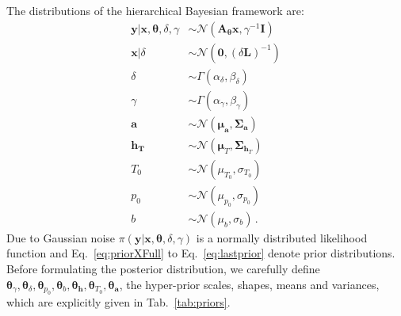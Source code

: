 \clearpage
\noindent
The distributions of the hierarchical Bayesian framework are:
\begin{subequations}
	\label{eq:BayMode}
	\begin{align}
		\bm{y} |  \bm{x},\bm{\theta},\delta,\gamma  &\sim \mathcal{N}(\bm{A}_{\bm{\theta}}  \bm{x}, \gamma^{-1} \bm{I}) \label{eq:likelihoodFull} \\
		\bm{x}| \delta  &\sim \mathcal{N}(\bm{0}, (\delta \bm{L})^{-1} ) \label{eq:priorXFull} \\
		\delta  &\sim \Gamma(\alpha_{\delta} , \beta_{\delta} )\label{eq:priorDelFull} \\
		\gamma  &\sim \Gamma(\alpha_{\gamma}, \beta_{\gamma})\label{eq:priorGamFull} \\
		\bm{a}  &\sim \mathcal{N}(\bm{\mu}_{\bm{a}}, \bm{\Sigma}_{\bm{a}})\\
		\bm{h}_{\bm{T}}  &\sim \mathcal{N}(\bm{\mu}_{T}, \bm{\Sigma}_{\bm{h}_T}) \\
		T_0  &\sim \mathcal{N}(\mu_{T_0}, \sigma_{T_0} )\\
		p_0  &\sim \mathcal{N}(\mu_{p_0}, \sigma_{p_0} )\\
		b  &\sim \mathcal{N}(\mu_b, \sigma_b )  \label{eq:lastprior}  \, .
	\end{align}
\end{subequations}
Due to Gaussian noise $\pi(\bm{y} |  \bm{x},\bm{\theta},\delta,\gamma )$ is a normally distributed likelihood function and Eq.~\ref{eq:priorXFull} to Eq.~\ref{eq:lastprior} denote prior distributions.
Before formulating the posterior distribution, we carefully define $\bm{\theta}_{\gamma}, \bm{\theta}_{\delta},\bm{\theta}_{p_0},\bm{\theta}_{b},\bm{\theta}_{\bm{h}},\bm{\theta}_{T_0},\bm{\theta}_{\bm{a}}$, the hyper-prior scales, shapes, means and variances, which are explicitly given in Tab.~\ref{tab:priors}.

